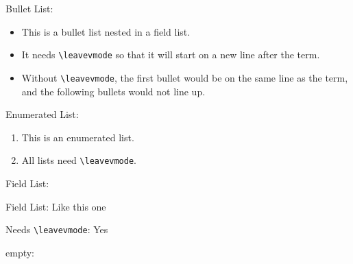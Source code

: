 \documentclass[a4paper]{article}
\newenvironment{DUfieldlist}%
    {\quote\description}
    {\enddescription\endquote}
\begin{document}
\begin{DUfieldlist}
\item[{Bullet List:}]\leavevmode
\begin{itemize}
\item This is a bullet list nested in a field list.

\item It needs \texttt{\textbackslash{}leavevmode} so that it will start on a new line
after the term.

\item Without \texttt{\textbackslash{}leavevmode}, the first bullet would be on the same line as
the term, and the following bullets would not line up.
\end{itemize}

\item[{Enumerated List:}]\leavevmode
\begin{enumerate}
\item This is an enumerated list.

\item All lists need \texttt{\textbackslash{}leavevmode}.
\end{enumerate}

\item[{Field List:}]\leavevmode
\begin{DUfieldlist}
\item[{Field List:}]
Like this one

\item[{Needs \texttt{\textbackslash{}leavevmode}:}]
Yes
\end{DUfieldlist}

\item[{empty:}]\end{DUfieldlist}
\end{document}

